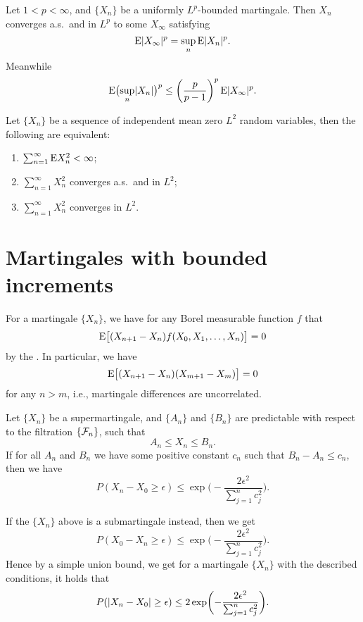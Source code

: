 \begin{namedthm}
    Let $1<p<\infty$, and $\{X_n\}$ be a uniformly $L^p$-bounded martingale. Then $X_n$ converges a.s.\ and in $L^p$ to some $X_\infty$ satisfying \[
        \mathop{}\!\mathrm{E} \lvert X_\infty \rvert^p = \sup_n \mathop{}\!\mathrm{E}\lvert X_n \rvert^p.
    \] Meanwhile \[
        \mathop{}\!\mathrm{E} \bigl(\sup_n\lvert X_n \rvert\bigr)^p \leq \biggl(\frac{p}{p-1}\biggr)^p \mathop{}\!\mathrm{E}\lvert X_\infty \rvert^p.
    \]
\end{namedthm}

\begin{thm}
    Let $\{X_n\}$ be a sequence of independent mean zero $L^2$ random variables, then the following are equivalent: \begin{enumerate}
        \item $\sum_{n=1}^\infty \mathop{}\!\mathrm{E} X_n^2 < \infty$;
        \item $\sum_{n=1}^\infty X_n^2$ converges a.s.\ and in $L^2$;
        \item $\sum_{n=1}^\infty X_n^2$ converges in $L^2$.
    \end{enumerate}
\end{thm}

\section{Martingales with bounded increments}
\begin{thm}
    
\end{thm}

\begin{fact}
    For a martingale $\{X_n\}$, we have for any Borel measurable function $f$ that \[
        \mathop{}\!\mathrm{E}\bigl[(X_{n+1}-X_n)f(X_0,X_1,\dotsc,X_{n})\bigr] = 0
    \] by the . In particular, we have \[
        \mathop{}\!\mathrm{E}\bigl[(X_{n+1}-X_n)(X_{m+1} - X_m)\bigr] = 0
    \] for any $n > m$, i.e., martingale differences are uncorrelated.
\end{fact}

\begin{namedthm}
    Let $\{X_n\}$ be a supermartingale, and $\{A_n\}$ and $\{B_n\}$ are predictable with respect to the filtration $\{\mathcal{F}_n\}$, such that \[A_n \leq X_n \leq B_n.\] If for all $A_n$ and $B_n$ we have some positive constant $c_n$ such that $B_n - A_n \leq c_n$, then we have \[
        P(X_n - X_0 \geq \epsilon) \leq \exp\biggl(-\frac{2 \epsilon^2}{\sum_{j=1}^n c_j^2}\biggr).
    \]

    If the $\{X_n\}$ above is a submartingale instead, then we get \[
        P(X_0 - X_n \geq \epsilon) \leq \exp\biggl(-\frac{2 \epsilon^2}{\sum_{j=1}^n c_j^2}\biggr).
    \] Hence by a simple union bound, we get for a martingale $\{X_n\}$ with the described conditions, it holds that \[
        P(\lvert X_n - X_0 \rvert \geq \epsilon) \leq 2\exp\biggl(-\frac{2 \epsilon^2}{\sum_{j=1}^n c_j^2}\biggr).
    \]
\end{namedthm}

